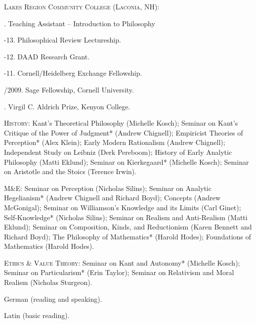 \documentclass[11pt]{article}
\begin{document}
\noindent \textsc{Lakes Region Community College (Laconia, NH):}
\medskip

. Teaching Assistant – Introduction to Philosophy

\bigskip


\medskip

-13. Philosophical Review Lectureship.

-12. DAAD Research Grant.

-11. Cornell/Heidelberg Exchange Fellowship.

/2009. Sage Fellowship, Cornell University.

. Virgil C. Aldrich Prize, Kenyon College.

\bigskip


\ind \textsc{History}: Kant’s Theoretical Philosophy (Michelle Kosch); Seminar on Kant’s Critique of the Power of Judgment* (Andrew Chignell); Empiricist Theories of Perception* (Alex Klein); Early Modern Rationalism (Andrew Chignell); Independent Study on Leibniz (Derk Pereboom); History of Early Analytic Philosophy (Matti Eklund); Seminar on Kierkegaard* (Michelle Kosch); Seminar on Aristotle and the Stoics (Terence Irwin).

\ind \textsc{M\&E}: Seminar on Perception (Nicholas Silins); Seminar on Analytic Hegelianism* (Andrew Chignell and Richard Boyd); Concepts (Andrew McGonigal); Seminar on Williamson’s Knowledge and its Limits (Carl Ginet); Self-Knowledge* (Nicholas Silins); Seminar on Realism and Anti-Realism (Matti Eklund); Seminar on Composition, Kinds, and Reductionism (Karen Bennett and Richard Boyd); The Philosophy of Mathematics* (Harold Hodes); Foundations of Mathematics (Harold Hodes).

\ind \textsc{Ethics \& Value Theory}: Seminar on Kant and Autonomy* (Michelle Kosch); Seminar on Particularism* (Erin Taylor); Seminar on Relativism and Moral Realism (Nicholas Sturgeon). 
\medskip


\medskip

\ind German (reading and speaking). 

\ind Latin (basic reading).

\bigskip
\end{document}
